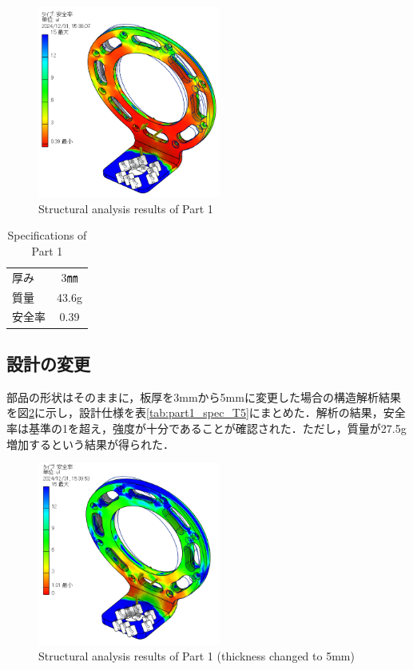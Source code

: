\begin{figure}[h]
  \centering
  \includegraphics[width=6cm]{images/design/T3_40.png}
  \caption{Structural analysis results of Part 1}
  \label{fig:T3_40}
\end{figure}

\begin{table}[h]
  \centering
  \caption{Specifications of Part 1}
  \begin{tabular}{lc}
    \hline
    厚み & 3㎜ \\ 
    質量 & 43.6g \\ 
    安全率 & 0.39 \\ \hline
  \end{tabular}
  \label{tab:part1_spec}
\end{table}
\clearpage

\subsection{設計の変更}
部品の形状はそのままに，板厚を3mmから5mmに変更した場合の構造解析結果を図\ref{fig:T5}に示し，設計仕様を表\ref{tab:part1_spec_T5}にまとめた．解析の結果，安全率は基準の1を超え，強度が十分であることが確認された．ただし，質量が27.5g増加するという結果が得られた．

\begin{figure}[h]
  \centering
  \includegraphics[width=6cm]{images/design/T5.png}
  \caption{Structural analysis results of Part 1 (thickness changed to 5mm)}
  \label{fig:T5}
\end{figure}

